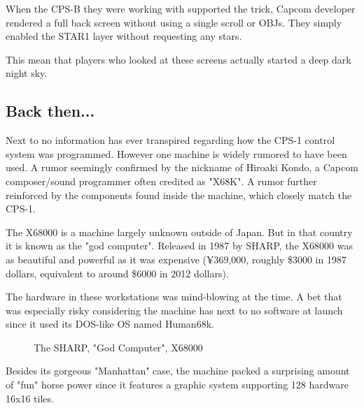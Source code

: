 \begin{trivia}
When the CPS-B they were working with supported the trick, Capcom developer rendered a full back screen without using a single scroll or OBJs. They simply enabled the STAR1 layer without requesting any stars. 

This mean that players who looked at these screens actually started a deep dark night sky.
\end{trivia}

\pagebreak

\subsection{Back then...}
Next to no information has ever transpired regarding how the CPS-1 control system was programmed. However one machine is widely rumored to have been used. A rumor seemingly confirmed by the nickname of Hiroaki Kondo, a Capcom composer/sound programmer often credited as "X68K". A rumor further reinforced by the components found inside the machine, which closely match the CPS-1.

The X68000 is a machine largely unknown outside of Japan. But in that country it is known as the "god computer". 
Released in 1987 by SHARP, the X68000 was as beautiful and powerful as it was expensive (¥369,000, roughly \$3000 in 1987 dollars, equivalent to around \$6000 in 2012 dollars).

The hardware in these workstations was mind-blowing at the time. A bet that was especially risky considering the machine has next to no software at launch since it used its DOS-like OS named Human68k.

\vfill

 \begin{figure}[H]
\caption*{The SHARP, "God Computer", X68000 }
\end{figure}


\pagebreak




Besides its gorgeous "Manhattan" case, the machine packed a surprising amount of "fun" horse power since it features a graphic system supporting 128 hardware 16x16 tiles.

